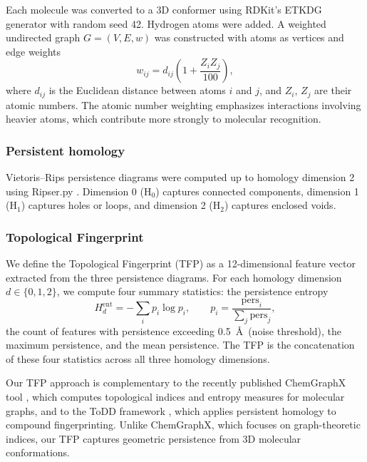 \documentclass[11pt,a4paper]{article}
\begin{document}
Each molecule was converted to a 3D conformer using RDKit's ETKDG generator with random seed \num{42}. Hydrogen atoms were added. A weighted undirected graph $G = (V, E, w)$ was constructed with atoms as vertices and edge weights
\begin{equation}
w_{ij} = d_{ij}\left(1 + \frac{Z_i Z_j}{100}\right),
\end{equation}
where $d_{ij}$ is the Euclidean distance between atoms $i$ and $j$, and $Z_i$, $Z_j$ are their atomic numbers. The atomic number weighting emphasizes interactions involving heavier atoms, which contribute more strongly to molecular recognition.

\subsubsection{Persistent homology}

Vietoris--Rips persistence diagrams were computed up to homology dimension 2 using Ripser.py \citep{ripser_2019}. Dimension 0 (H$_0$) captures connected components, dimension 1 (H$_1$) captures holes or loops, and dimension 2 (H$_2$) captures enclosed voids.

\subsubsection{Topological Fingerprint}

We define the Topological Fingerprint (TFP) as a \num{12}-dimensional feature vector extracted from the three persistence diagrams. For each homology dimension $d \in \{0, 1, 2\}$, we compute four summary statistics: the persistence entropy
\begin{equation}
H_d^{\mathrm{ent}} = -\sum_i p_i \log p_i, \qquad p_i = \frac{\mathrm{pers}_i}{\sum_j \mathrm{pers}_j},
\end{equation}
the count of features with persistence exceeding \SI{0.5}{\angstrom}\ (noise threshold), the maximum persistence, and the mean persistence. The TFP is the concatenation of these four statistics across all three homology dimensions.

Our TFP approach is complementary to the recently published ChemGraphX tool \citep{chemgraphx_2026}, which computes topological indices and entropy measures for molecular graphs, and to the ToDD framework \citep{todd_2023}, which applies persistent homology to compound fingerprinting. Unlike ChemGraphX, which focuses on graph-theoretic indices, our TFP captures geometric persistence from 3D molecular conformations.
\end{document}

